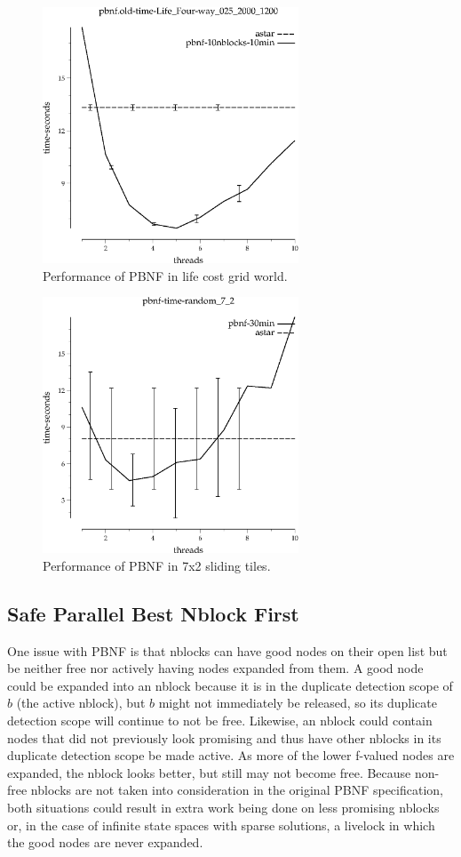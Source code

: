 \documentclass{article}
\begin{document}
\begin{figure}[h!]
\includegraphics[width=3in]{../graphs/seth/grid-life-single/PBNF.eps}
\caption{Performance of PBNF in life cost grid world.}
\label{fig:PBNF-life}
\end{figure}

\begin{figure}[h!]
\includegraphics[width=3in]{../graphs/seth/tiles-single/PBNF.eps}
\caption{Performance of PBNF in 7x2 sliding tiles.}
\label{fig:PBNF-life}
\end{figure}
\subsection{Safe Parallel Best Nblock First}
One issue with PBNF is that nblocks can have good nodes on their open list but be neither free nor actively having nodes expanded from them. A good node could be expanded into an nblock because it is in the duplicate detection scope of $b$ (the active nblock), but $b$ might not immediately be released, so its duplicate detection scope will continue to not be free. Likewise, an nblock could contain nodes that did not previously look promising and thus have other nblocks in its duplicate detection scope be made active. As more of the lower f-valued nodes are expanded, the nblock looks better, but still may not become free. Because non-free nblocks are not taken into consideration in the original PBNF specification, both situations could result in extra work being done on less promising nblocks or, in the case of infinite state spaces with sparse solutions, a livelock in which the good nodes are never expanded.
\end{document}
